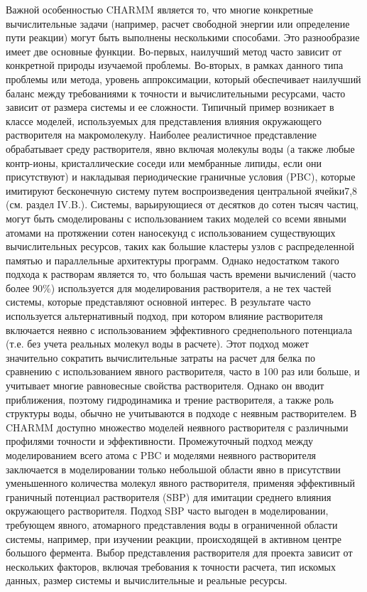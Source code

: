 Важной особенностью CHARMM является то, что многие конкретные вычислительные задачи (например, расчет свободной энергии или определение пути реакции) могут быть выполнены несколькими способами. Это разнообразие имеет две основные функции. Во-первых, наилучший метод часто зависит от конкретной природы изучаемой проблемы. Во-вторых, в рамках данного типа проблемы или метода, уровень аппроксимации, который обеспечивает наилучший баланс между требованиями к точности и вычислительными ресурсами, часто зависит от размера системы и ее сложности. Типичный пример возникает в классе моделей, используемых для представления влияния окружающего растворителя на макромолекулу. Наиболее реалистичное представление обрабатывает среду растворителя, явно включая молекулы воды (а также любые контр-ионы, кристаллические соседи или мембранные липиды, если они присутствуют) и накладывая периодические граничные условия (PBC), которые имитируют бесконечную систему путем воспроизведения центральной ячейки7,8 (см. раздел IV.B.). Системы, варьирующиеся от десятков до сотен тысяч частиц, могут быть смоделированы с использованием таких моделей со всеми явными атомами на протяжении сотен наносекунд с использованием существующих вычислительных ресурсов, таких как большие кластеры узлов с распределенной памятью и параллельные архитектуры программ. Однако недостатком такого подхода к растворам является то, что большая часть времени вычислений (часто более 90\%) используется для моделирования растворителя, а не тех частей системы, которые представляют основной интерес. В результате часто используется альтернативный подход, при котором влияние растворителя включается неявно с использованием эффективного среднепольного потенциала (т.е. без учета реальных молекул воды в расчете). Этот подход может значительно сократить вычислительные затраты на расчет для белка по сравнению с использованием явного растворителя, часто в 100 раз или больше, и учитывает многие равновесные свойства растворителя. Однако он вводит приближения, поэтому гидродинамика и трение растворителя, а также роль структуры воды, обычно не учитываются в подходе с неявным растворителем. В CHARMM доступно множество моделей неявного растворителя с различными профилями точности и эффективности. Промежуточный подход между моделированием всего атома с PBC и моделями неявного растворителя заключается в моделировании только небольшой области явно в присутствии уменьшенного количества молекул явного растворителя, применяя эффективный граничный потенциал растворителя (SBP) для имитации среднего влияния окружающего растворителя. Подход SBP часто выгоден в моделировании, требующем явного, атомарного представления воды в ограниченной области системы, например, при изучении реакции, происходящей в активном центре большого фермента. Выбор представления растворителя для проекта зависит от нескольких факторов, включая требования к точности расчета, тип искомых данных, размер системы и вычислительные и реальные ресурсы.

